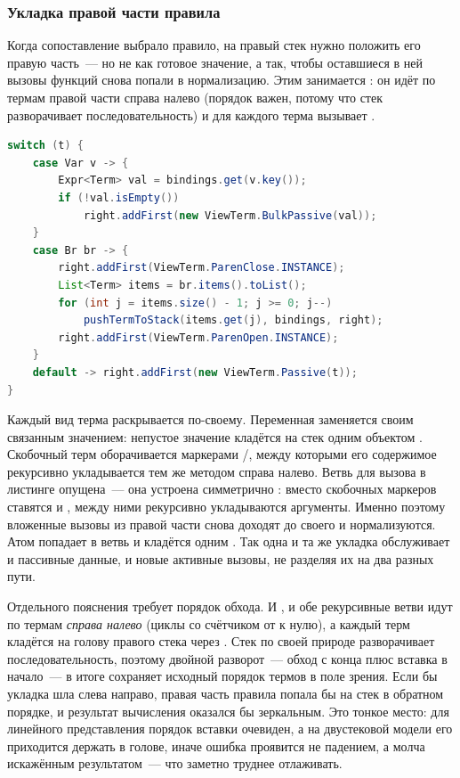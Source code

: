 \subsubsection{Укладка правой части правила}

Когда сопоставление выбрало правило, на правый стек нужно положить его правую
часть~--- но не как готовое значение, а так, чтобы оставшиеся в ней вызовы функций
снова попали в нормализацию. Этим занимается : он идёт по
термам правой части справа налево (порядок важен, потому что стек разворачивает
последовательность) и для каждого терма вызывает .

\begin{lstlisting}[language=Java,caption={Укладка терма правой части на стек (ветви Var и Br)},label={lst:push-term}]
switch (t) {
    case Var v -> {
        Expr<Term> val = bindings.get(v.key());
        if (!val.isEmpty())
            right.addFirst(new ViewTerm.BulkPassive(val));
    }
    case Br br -> {
        right.addFirst(ViewTerm.ParenClose.INSTANCE);
        List<Term> items = br.items().toList();
        for (int j = items.size() - 1; j >= 0; j--)
            pushTermToStack(items.get(j), bindings, right);
        right.addFirst(ViewTerm.ParenOpen.INSTANCE);
    }
    default -> right.addFirst(new ViewTerm.Passive(t));
}
\end{lstlisting}

Каждый вид терма раскрывается по-своему. Переменная заменяется своим связанным
значением: непустое значение кладётся на стек одним объектом .
Скобочный терм \prog{(\ldots)} оборачивается маркерами
/, между которыми его содержимое рекурсивно
укладывается тем же методом справа налево. Ветвь для вызова  в
листинге опущена~--- она устроена симметрично : вместо скобочных маркеров
ставятся  и , между ними рекурсивно укладываются
аргументы. Именно поэтому вложенные вызовы из правой части снова доходят до своего
 и нормализуются. Атом попадает в ветвь  и кладётся
одним . Так одна и та же укладка обслуживает и пассивные данные, и
новые активные вызовы, не разделяя их на два разных пути.

Отдельного пояснения требует порядок обхода. И , и обе
рекурсивные ветви идут по термам \emph{справа налево} (циклы со счётчиком от
 к нулю), а каждый терм кладётся на голову правого стека через
. Стек по своей природе разворачивает последовательность, поэтому
двойной разворот~--- обход с конца плюс вставка в начало~--- в итоге сохраняет
исходный порядок термов в поле зрения. Если бы укладка шла слева направо, правая
часть правила попала бы на стек в обратном порядке, и результат вычисления
оказался бы зеркальным. Это тонкое место: для линейного представления порядок
вставки очевиден, а на двустековой модели его приходится держать в голове, иначе
ошибка проявится не падением, а молча искажённым результатом~--- что заметно
труднее отлаживать.


